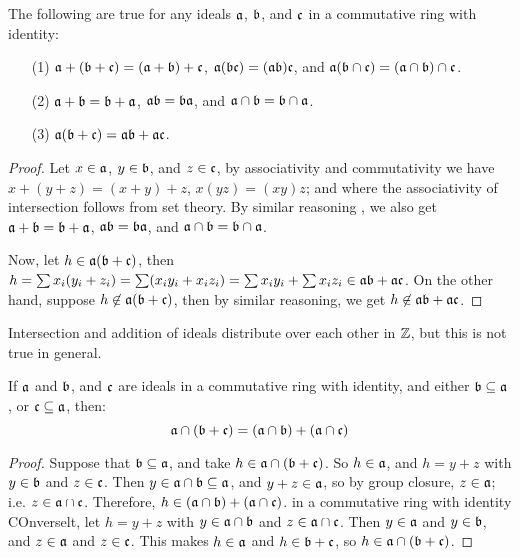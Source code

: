 \begin{theorem}\label{theorem_5.5.6}
  The following are true for any ideals $\af$,  $\bf$, and $\cf$ in a
  commutative ring with identity:
  \begin{enumerate}
    \item[(1)] $\af+(\bf+\cf)=(\af+\bf)+\cf$, $\af(\bf\cf)=(\af\bf)\cf$, and
      $\af (\bf \cap \cf)=(\af \cap \bf) \cap \cf$.

    \item[(2)] $\af+\bf=\bf+\af$, $\af\bf=\bf\af$, and  $\af \cap \bf=\bf \cap
      \af$.

    \item[(3)] $\af(\bf+\cf)=\af\bf+\af\cf$.
  \end{enumerate}
\end{theorem}
\begin{proof}
  Let $x \in \af$, $y \in \bf$, and $z \in \cf$, by associativity and
  commutativity we have $x+(y+z)=(x+y)+z$, $x(yz)=(xy)z$; and where the
  associativity of intersection follows from set theory. By similar reasoning ,
  we also get  $\af+\bf=\bf+\af$,  $\af\bf=\bf\af$, and  $\af \cap \bf=\bf \cap
  \af$.

  Now, let  $h \in \af(\bf+\cf)$, then
  $h=\sum{x_i(y_i+z_i)}=\sum(x_iy_i+x_iz_i)=\sum{x_iy_i}+\sum{x_iz_i} \in
  \af\bf+\af\cf$. On the other hand, suppose $h \not\in \af(\bf+\cf)$, then by
  similar reasoning, we get $h \not\in \af\bf+\af\cf$.
\end{proof}

\begin{example}\label{example_5.18}
  Intersection and addition of ideals distribute over each other in $\Z$, but
  this is not true in general.
\end{example}

\begin{theorem}[Modularity]\label{theorem_5.5.7}
  If $\af$ and $\bf$, and $\cf$ are ideals in a commutative ring with
  identity, and either $\bf \subseteq \af$, or
  $\cf \subseteq \af$, then:
  \begin{equation*}
    \af \cap (\bf+\cf)=(\af \cap \bf)+(\af \cap \cf)
  \end{equation*}
\end{theorem}
\begin{proof}
  Suppose that $\bf \subseteq \af$, and take $h \in \af \cap (\bf+\cf)$. So $h
  \in \af$, and $h=y+z$ with  $y \in \bf$ and $z \in \cf$. Then $y \in \af \cap
  \bf \subseteq \af$, and $y+z \in \af$, so by group closure, $z \in \af$; i.e.
  $z \in \af \cap \cf$. Therefore, $h \in (\af \cap \bf)+(\af \cap \cf)$.
 in a commutative ring with identity
  COnverselt, let $h=y+z$ with  $y \in \af \cap \bf$ and $z \in \af \cap \cf$.
  Then $y \in \af$ and $y \in \bf$, and $z \in \af$ and $z \in \cf$. This makes
  $h \in \af$ and $h \in \bf+\cf$, so $h \in \af \cap (\bf+\cf)$.
\end{proof}


